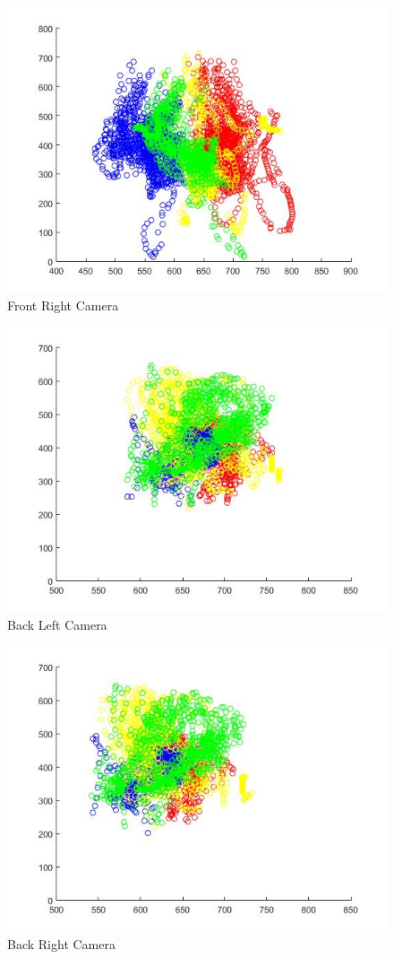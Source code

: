 \begin{figure}[H]\captionsetup{width=0.5\linewidth, font=small}  
\includegraphics[width=0.8\linewidth]{figures/fr.JPG}
\caption{Front Right Camera}
\label{fig:fr}
\end{figure}
\newpage
\begin{figure}[H]\captionsetup{width=0.5\linewidth, font=small}  
\includegraphics[width=0.8\linewidth]{figures/bl.JPG}
\caption{Back Left Camera}
\label{fig:bl}
\end{figure}
\begin{figure}[H]\captionsetup{width=0.5\linewidth, font=small}  
\includegraphics[width=0.8\linewidth]{figures/br.JPG}
\caption{Back Right Camera}
\label{fig:br}
\end{figure}


